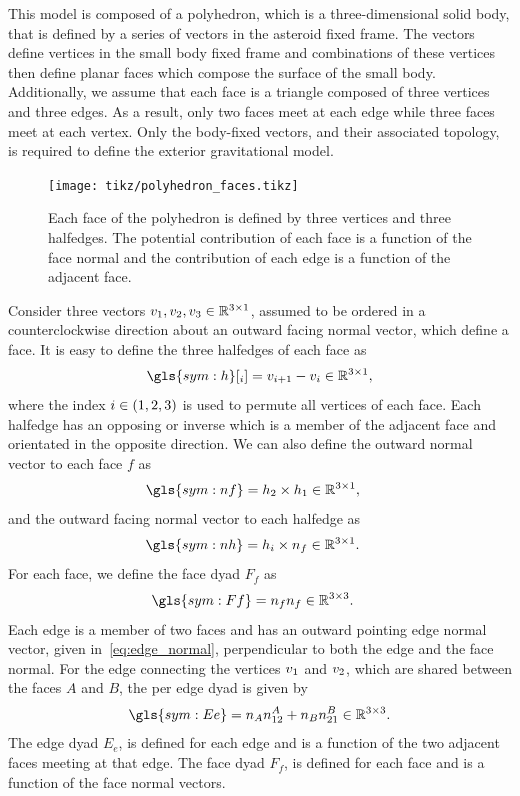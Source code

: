This model is composed of a \gls{polyhedron}, which is a three-dimensional solid body, that is defined by a series of vectors in the asteroid fixed frame.
The vectors define vertices in the small body fixed frame and combinations of these vertices then define planar faces which compose the surface of the small body.
Additionally, we assume that each face is a triangle composed of three vertices and three edges.
As a result, only two faces meet at each edge while three faces meet at each vertex.
Only the body-fixed vectors, and their associated topology, is required to define the exterior gravitational model.

\begin{figure}[htbp]
    \centering
    \texttt{[image: tikz/polyhedron\_faces.tikz]}
    \caption{Each face of the polyhedron is defined by three vertices and three halfedges.
    The potential contribution of each face is a function of the face normal and the contribution of each edge is a function of the adjacent face.\label{fig:polyhedron_face}}
\end{figure}
Consider three vectors \( v_1, v_2, v_3 \in \mathbb{R}^{3 \times 1} \), assumed to be ordered in a counterclockwise direction about an outward facing normal vector, which define a face.
It is easy to define the three halfedges of each face as
\begin{align}\label{eq:edges}
    \gls{sym:h}[_i] = \vc{v}_{i+1} - \vc{v}_i \in \R^{3 \times 1 },
\end{align}
where the index \( i \in \left( 1,2,3 \right) \) is used to permute all vertices of each face.
Each halfedge has an opposing or inverse which is a member of the adjacent face and orientated in the opposite direction.
We can also define the outward normal vector to each face \( f \) as
\begin{align}\label{eq:face_normal}
    \gls{sym:nf} &= \vc{h}_2 \times \vc{h}_1 \in \R^{3 \times 1},
\end{align}
and the outward facing normal vector to each halfedge as
\begin{align}\label{eq:edge_normal}
    \gls{sym:nh} &=  \vc{h}_i \times \vc{n}_f \in \R^{3 \times 1}.
\end{align}
For each face, we define the face dyad \( F_f \) as
\begin{align}\label{eq:face_dyad}
    \gls{sym:Ff} &= \vc{n}_f \vc{n}_f \in \R^{3 \times 3}.
\end{align}
Each edge is a member of two faces and has an outward pointing edge normal vector, given in~\cref{eq:edge_normal}, perpendicular to both the edge and the face normal.
For the edge connecting the vertices \( v_1 \) and \( v_2 \), which are shared between the faces \(A\) and \( B\), the per edge dyad is given by
\begin{align}\label{eq:edge_dyad}
    \gls{sym:Ee} = \vc{n}_A \vc{n}_{12}^A + \vc{n}_B \vc{n}_{21}^B \in \R^{3 \times 3}.
\end{align}
The edge dyad \( E_e  \), is defined for each edge and is a function of the two adjacent faces meeting at that edge.
The face dyad \( F_f \), is defined for each face and is a function of the face normal vectors.

